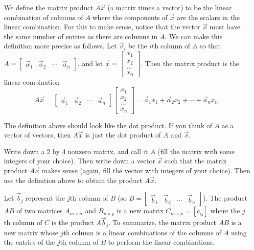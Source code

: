 \begin{definition}
We define the matrix product $A\vec x$ (a matrix times a vector) to be the linear combination of columns of $A$ where the components of $\vec x$ are the scalars in the linear combination. 
For this to make sense, notice that the vector $\vec x$ must have the same number of entries as there are columns in $A$. 
We can make this definition more precise as follows. 
Let $\vec v_i$ be the $i$th column of $A$ so that 
$A = \begin{bmatrix}\vec a_1 & \vec a_2 &\cdots &\vec a_n\end{bmatrix}$, 
and let $\vec x = \begin{bmatrix}x_1\\x_2\\ \hdots \\ x_n\end{bmatrix}$. Then the matrix product is the linear combination 
$$A\vec x 
=\begin{bmatrix}\vec a_1 & \vec a_2 &\cdots &\vec a_n\end{bmatrix}\begin{bmatrix}x_1\\x_2\\ \hdots \\ x_n\end{bmatrix}
= \vec a_1 x_1+\vec a_2 x_2+\cdots +\vec a_n x_n.$$ 
\end{definition}
The definition above should look like the dot product. If you think of $A$ as a vector of vectors, then $A\vec x$ is just the dot product of $A$ and $\vec x$.  

\begin{problem}
 Write down a 2 by 4 nonzero matrix, and call it $A$ (fill the matrix with some integers of your choice). Then write down a vector $\vec x$ such that the matrix product $A\vec x$ makes sense (again, fill the vector with integers of your choice).  Then use the definition above to obtain the product $A\vec x$. 
\end{problem}


\begin{definition}
Let $\vec b_j$ represent the $j$th column of $B$ (so $B = \begin{bmatrix}\vec b_1 & \vec b_2 &\cdots &\vec b_n\end{bmatrix}$).  The product $AB$ of two matrices {$A_{m\times n}$} and {$B_{n\times p}$} is a new matrix {$C_{m\times p}=[c_{ij}]$} where the $j$th column of $C$ is the product $A\vec b_j$.  To summarize, the matrix product $AB$ is a new matrix whose $j$th column is a linear combinations of the columns of $A$ using the entries of the $j$th column of $B$ to perform the linear combinations. 
\end{definition}


